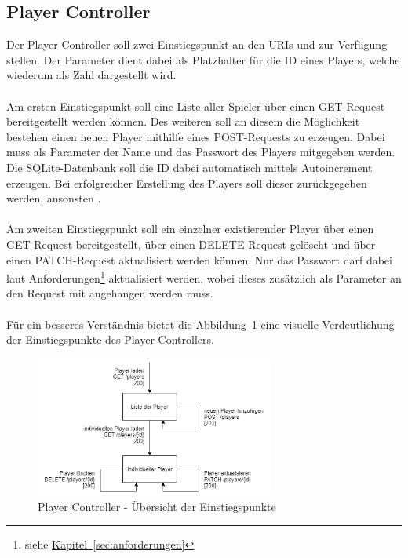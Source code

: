 \subsection{Player Controller}\label{sec:playerController}
Der Player Controller soll zwei Einstiegspunkt an den \glspl{URI}  und  zur Verfügung stellen. Der Parameter  dient dabei als Platzhalter für die ID eines Players, welche wiederum als Zahl dargestellt wird.\\
\\
Am ersten Einstiegspunkt soll eine Liste aller Spieler über einen GET-Request bereitgestellt werden können. Des weiteren soll an diesem die Möglichkeit bestehen einen neuen Player mithilfe eines POST-Requests zu erzeugen. Dabei muss als Parameter der Name und das Passwort des Players mitgegeben werden. Die SQLite-Datenbank soll die ID dabei automatisch mittels Autoincrement erzeugen. Bei erfolgreicher Erstellung des Players soll dieser zurückgegeben werden, ansonsten .\\
\\
Am zweiten Einstiegspunkt soll ein einzelner existierender Player über einen GET-Request bereitgestellt, über einen DELETE-Request gelöscht und über einen PATCH-Request aktualisiert werden können. Nur das Passwort darf dabei laut Anforderungen\footnote{siehe \hyperref[sec:anforderungen]{Kapitel~\ref{sec:anforderungen}}} aktualisiert werden, wobei dieses zusätzlich als Parameter an den Request mit angehangen werden muss.\\
\\
Für ein besseres Verständnis bietet die \hyperref[fig:playerController]{Abbildung~\ref{fig:playerController}} eine visuelle Verdeutlichung der Einstiegspunkte des Player Controllers.
\begin{figure}[htb]
	\includegraphics[width=0.7\textwidth]{images/player-controller.png}
	\caption{Player Controller - Übersicht der Einstiegspunkte}
	\label{fig:playerController}
\end{figure}

